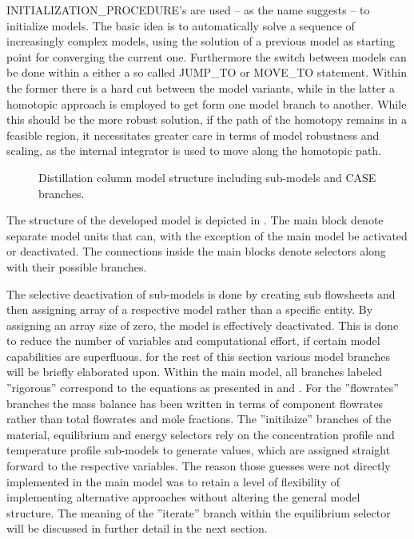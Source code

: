     INITIALIZATION\_PROCEDURE's are used -- as the name suggests -- to initialize models. The basic idea is to automatically
    solve a sequence of increasingly complex models, using the solution of a previous model as starting point for 
    converging the current one. Furthermore the switch between models can be done within a either a so called JUMP\_TO
    or MOVE\_TO statement. Within the former there is a hard cut between the model variants, while in the latter 
    a homotopic approach is employed to get form one model branch to another. While this should be the more robust 
    solution, if the path of the homotopy remains in a feasible region, it necessitates greater care in terms of model 
    robustness and scaling, as the internal integrator is used to move along the homotopic path. 
    
    \begin{landscape}
        \begin{figure}
            \center
            
            \caption{Distillation column model structure including sub-models and CASE branches.}
            \label{fig:mathpro:modelstruct}
        \end{figure}
    \end{landscape}
    
    The structure of the developed model is depicted in . The main block denote separate model 
    units that can, with the exception of the main model be activated or deactivated. The connections inside the main blocks
    denote selectors along with their possible branches.  

    The selective deactivation of sub-models is done by creating sub flowsheets and then assigning array of a respective model 
    rather than a specific entity. By assigning an array size of zero, the model is effectively deactivated. This is done to reduce 
    the number of variables and computational effort, if certain model capabilities are superfluous. for the rest of this section 
    various model branches will be briefly elaborated upon. Within the main model, all branches labeled ''rigorous'' correspond
    to the equations as presented in  and . For the ''flowrates'' 
    branches the mass balance has been written in terms of component flowrates rather than total flowrates and mole fractions. 
    The ''initilaize'' branches of the material, equilibrium and energy selectors rely on the concentration profile and temperature 
    profile sub-models to generate values, which are assigned straight forward to the respective variables. The reason those guesses 
    were not directly implemented in the main model was to retain a level of flexibility of implementing alternative approaches 
    without altering the general model structure. The meaning of the ''iterate'' branch within the equilibrium selector 
    will be discussed in further detail in the next section. 
    
